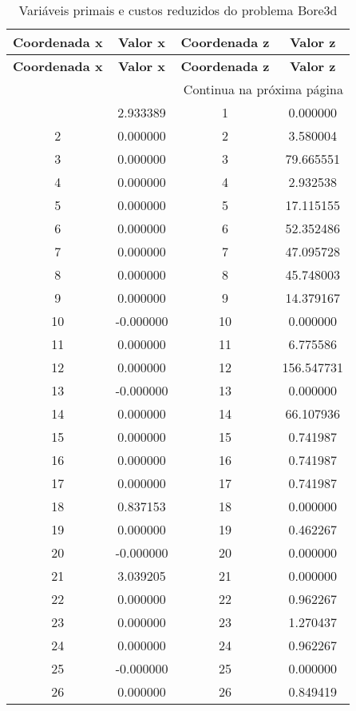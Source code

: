 \documentclass[12pt]{article}
\begin{document}
\begin{longtable}{@{}cccc@{}}
\caption{Variáveis primais e custos reduzidos do problema Bore3d} \\
\toprule
\textbf{Coordenada x} & \textbf{Valor x} & \textbf{Coordenada z} & \textbf{Valor z} \\
\midrule
\endfirsthead

\toprule
\textbf{Coordenada x} & \textbf{Valor x} & \textbf{Coordenada z} & \textbf{Valor z} \\
\midrule
\endhead

\midrule \multicolumn{4}{r}{{Continua na próxima página}} \\ \midrule
\endfoot

\bottomrule
\endlastfoot
1 & 2.933389 & 1 & 0.000000 \\
2 & 0.000000 & 2 & 3.580004 \\
3 & 0.000000 & 3 & 79.665551 \\
4 & 0.000000 & 4 & 2.932538 \\
5 & 0.000000 & 5 & 17.115155 \\
6 & 0.000000 & 6 & 52.352486 \\
7 & 0.000000 & 7 & 47.095728 \\
8 & 0.000000 & 8 & 45.748003 \\
9 & 0.000000 & 9 & 14.379167 \\
10 & -0.000000 & 10 & 0.000000 \\
11 & 0.000000 & 11 & 6.775586 \\
12 & 0.000000 & 12 & 156.547731 \\
13 & -0.000000 & 13 & 0.000000 \\
14 & 0.000000 & 14 & 66.107936 \\
15 & 0.000000 & 15 & 0.741987 \\
16 & 0.000000 & 16 & 0.741987 \\
17 & 0.000000 & 17 & 0.741987 \\
18 & 0.837153 & 18 & 0.000000 \\
19 & 0.000000 & 19 & 0.462267 \\
20 & -0.000000 & 20 & 0.000000 \\
21 & 3.039205 & 21 & 0.000000 \\
22 & 0.000000 & 22 & 0.962267 \\
23 & 0.000000 & 23 & 1.270437 \\
24 & 0.000000 & 24 & 0.962267 \\
25 & -0.000000 & 25 & 0.000000 \\
26 & 0.000000 & 26 & 0.849419 \\

\end{longtable}
\end{document}
